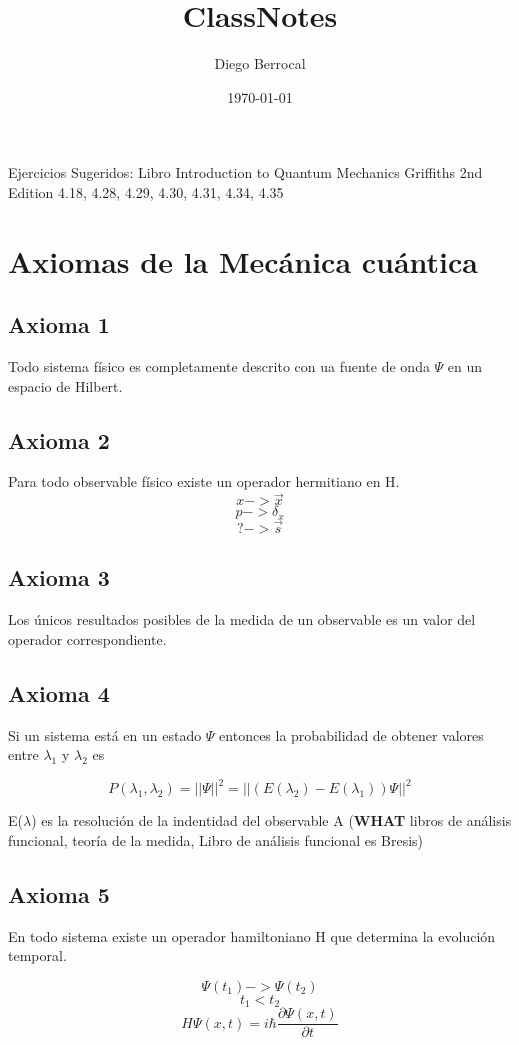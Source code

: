 \documentclass[11pt]{article}
\author{Diego Berrocal}
\date{\today}
\title{ClassNotes}
\begin{document}
\maketitle
\tableofcontents

Ejercicios Sugeridos: Libro Introduction to Quantum Mechanics Griffiths 2nd Edition
4.18, 4.28, 4.29, 4.30, 4.31, 4.34, 4.35

\section{Axiomas de la Mecánica cuántica}
\label{sec-1}
\subsection{Axioma 1}
\label{sec-1-1}
Todo sistema físico es completamente descrito con ua fuente de onda $\Psi$ en un espacio de Hilbert.
\subsection{Axioma 2}
\label{sec-1-2}
Para todo observable físico existe un operador hermitiano en H.
$$ x -> \vec{x} $$
$$ p -> \delta_x $$
$$ ? -> \vec{s} $$
\subsection{Axioma 3}
\label{sec-1-3}
Los únicos resultados posibles de la medida de un observable es un
valor del operador correspondiente.
\subsection{Axioma 4}
\label{sec-1-4}
Si un sistema está en un estado $\Psi$ entonces la probabilidad de
obtener valores entre $\lambda$$_{\text{1}}$ y $\lambda$$_{\text{2}}$ es

$$ P(\lambda_1, \lambda_2) = || \Psi ||^2 = || (E(\lambda_2) - E(\lambda_1) )\Psi ||^2$$

E($\lambda$) es la resolución de la indentidad del observable A (\textbf{WHAT}
libros de análisis funcional, teoría de la medida, Libro de análisis funcional es Bresis)
\subsection{Axioma 5}
\label{sec-1-5}
En todo sistema existe un operador hamiltoniano H que determina la evolución temporal.

$$ \Psi (t_1) -> \Psi(t_2) $$
$$ t_1 < t_2 $$
$$ H\Psi(x,t) = i\hbar \frac{\partial\Psi(x,t)}{\partial t} $$
\end{document}

